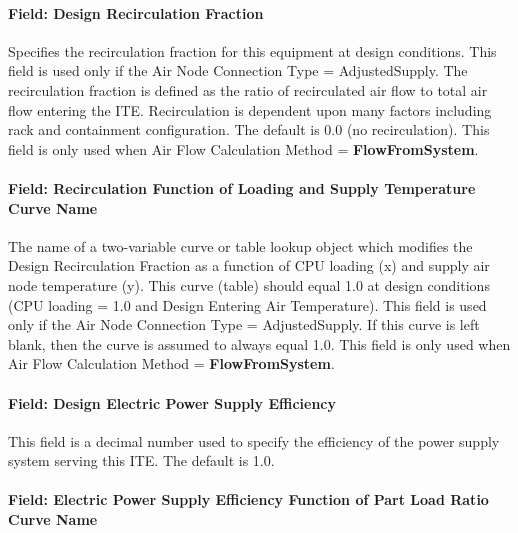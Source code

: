 \paragraph{Field: Design Recirculation Fraction}\label{field-design-recirculation-fraction}

Specifies the recirculation fraction for this equipment at design conditions. This field is used only if the Air Node Connection Type = AdjustedSupply. The recirculation fraction is defined as the ratio of recirculated air flow to total air flow entering the ITE. Recirculation is dependent upon many factors including rack and containment configuration. The default is 0.0 (no recirculation). This field is only used when Air Flow Calculation Method = \textbf{FlowFromSystem}.

\paragraph{Field: Recirculation Function of Loading and Supply Temperature Curve Name}\label{field-recirculation-function-of-loading-and-supply-temperature-curve-name}

The name of a two-variable curve or table lookup object which modifies the Design Recirculation Fraction as a function of CPU loading (x) and supply air node temperature (y). This curve (table) should equal 1.0 at design conditions (CPU loading = 1.0 and Design Entering Air Temperature). This field is used only if the Air Node Connection Type = AdjustedSupply. If this curve is left blank, then the curve is assumed to always equal 1.0. This field is only used when Air Flow Calculation Method = \textbf{FlowFromSystem}.

\paragraph{Field: Design Electric Power Supply Efficiency}\label{field-design-electric-power-supply-efficiency}

This field is a decimal number used to specify the efficiency of the power supply system serving this ITE. The default is 1.0.

\paragraph{Field: Electric Power Supply Efficiency Function of Part Load Ratio Curve Name}\label{field-electric-power-supply-efficiency-function-of-part-load-ratio-curve-name}

